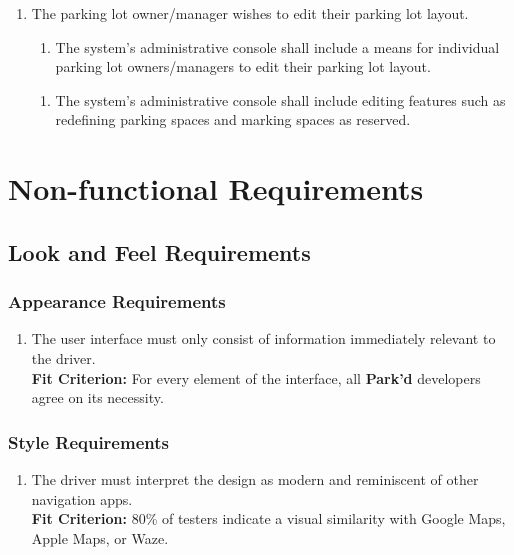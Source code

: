 \documentclass[12pt,letterpaper]{article}
\newcounter{businesseventnum}
\newcounter{funcreqnum}
\begin{document}
\begin{enumerate}[{BE}\thebusinesseventnum.] 
\item The parking lot owner/manager wishes to edit their parking lot layout.
\begin{enumerate}[{FR}\thefuncreqnum.] 
    \item The system's administrative console shall include a means for
    individual parking lot owners/managers to edit their parking lot layout.
\end{enumerate}
\begin{enumerate}[{FR}\thefuncreqnum.] 
    \item The system's administrative console shall include editing features
    such as redefining parking spaces and marking spaces as reserved.
\end{enumerate}
\end{enumerate}

\newpage
\section{Non-functional Requirements}
\subsection{Look and Feel Requirements}
\subsubsection{Appearance Requirements}
\begin{enumerate}[{LF}1.] 
    \item The user interface must only consist of information immediately
    relevant to the driver. \label{pocnf1} \\
    \textbf{Fit Criterion:} For every element of the interface, all
    \textbf{Park'd} developers agree on its necessity.
\end{enumerate}

\subsubsection{Style Requirements}
\begin{enumerate}[resume*]  
    \item The driver must interpret the design as modern and reminiscent of
    other navigation apps.\\
    \textbf{Fit Criterion:} 80\% of testers indicate a visual similarity with
    Google Maps, Apple Maps, or Waze.
\end{enumerate}
\end{document}
